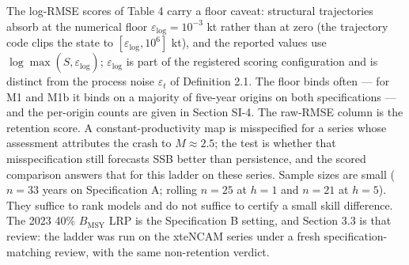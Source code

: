 \documentclass[11pt]{article}
\begin{document}
The log-RMSE scores of Table 4 carry a floor caveat: structural
trajectories absorb at the numerical floor
\(\varepsilon_{\mathrm{log}} = 10^{-3}\) kt rather than at zero (the
trajectory code clips the state to
\([\varepsilon_{\mathrm{log}}, 10^{6}]\) kt), and the reported values
use \(\log\max(\hat S, \varepsilon_{\mathrm{log}})\);
\(\varepsilon_{\mathrm{log}}\) is part of the registered scoring
configuration and is distinct from the process noise \(\varepsilon_t\)
of Definition 2.1. The floor binds often --- for M1 and M1b it binds on a majority of
five-year origins on both specifications --- and the per-origin counts
are given in Section SI-4. The raw-RMSE column is the retention score. A constant-productivity map is
misspecified for a series whose assessment attributes the crash to
\(M \approx 2.5\); the test is whether that misspecification still
forecasts SSB better than persistence, and the scored comparison answers
that for this ladder on these series. Sample sizes are small
(\(n=33\) years on Specification A; rolling \(n=25\) at \(h=1\) and
\(n=21\) at \(h=5\)). They suffice to rank models and do not suffice to
certify a small skill difference. The 2023 40\% \(B_{\mathrm{MSY}}\) LRP
is the Specification B setting, and Section 3.3 is that review: the
ladder was run on the xteNCAM series under a fresh
specification-matching review, with the same non-retention verdict.
\end{document}
